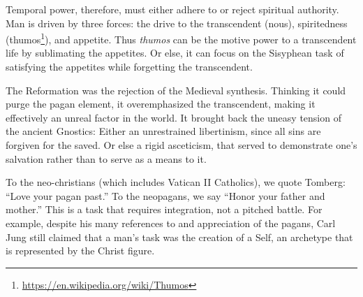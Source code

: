 Temporal power, therefore, must either adhere to or reject spiritual authority. Man is driven by three forces: the drive to the transcendent (nous), spiritedness (thumos\footnote{\url{https://en.wikipedia.org/wiki/Thumos}}), and appetite. Thus \emph{thumos} can be the motive power to a transcendent life by sublimating the appetites. Or else, it can focus on the Sisyphean task of satisfying the appetites while forgetting the transcendent.

The Reformation was the rejection of the Medieval synthesis. Thinking it could purge the pagan element, it overemphasized the transcendent, making it effectively an unreal factor in the world. It brought back the uneasy tension of the ancient Gnostics: Either an unrestrained libertinism, since all sins are forgiven for the saved. Or else a rigid asceticism, that served to demonstrate one's salvation rather than to serve as a means to it.

To the neo-christians (which includes Vatican II Catholics), we quote Tomberg: ``Love your pagan past.'' To the neopagans, we say ``Honor your father and mother.'' This is a task that requires integration, not a pitched battle. For example, despite his many references to and appreciation of the pagans, Carl Jung still claimed that a man's task was the creation of a Self, an archetype that is represented by the Christ figure.


